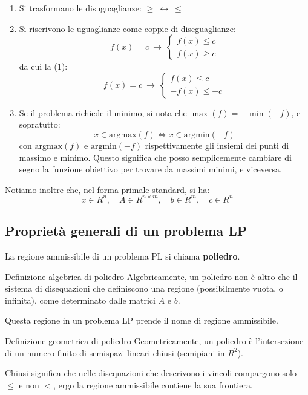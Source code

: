 \documentclass[a4paper,11pt]{article}
\begin{document}
\begin{enumerate}
	\item Si trasformano le disuguaglianze: $ \geq \ \leftrightarrow \ \leq $
	\item Si riscrivono le uguaglianze come coppie di diseguaglianze:
		$$
			f(x) = c \ \rightarrow \
		\begin{cases}
			f(x) \leq c \\ 
			f(x) \geq c
		\end{cases}
		$$
		da cui la (1):
		$$
			f(x) = c \ \rightarrow \
		\begin{cases}
			f(x) \leq c \\ 
			-f(x) \leq -c
		\end{cases}
		$$
	\item Se il problema richiede il minimo, si nota che $ \max(f) = -\min(-f) $, e sopratutto:
		$$
		\bar{x} \in \mathrm{argmax}(f) \Leftrightarrow \bar{x} \in \mathrm{argmin}(-f)
		$$
		con $ \mathrm{argmax}(f) $ e $ \mathrm{argmin}(-f) $ rispettivamente gli insiemi dei punti di massimo e minimo.
		Questo significa che posso semplicemente cambiare di segno la funzione obiettivo per trovare da massimi minimi, e viceversa.
\end{enumerate}

Notiamo inoltre che, nel forma primale standard, si ha:
$$
	x \in R^n, \quad
	A \in R^{n \times m}, \quad
	b \in R^m, \quad
	c \in R^n
$$

\subsection{Proprietà generali di un problema LP}
La regione ammissibile di un problema PL si chiama \textbf{poliedro}.

\begin{definition}{Definizione algebrica di poliedro}
	Algebricamente, un poliedro non è altro che il sistema di disequazioni che definiscono una regione (possibilmente vuota, o infinita), come determinato dalle matrici $A$ e $b$. 
\end{definition}

Questa regione in un problema LP prende il nome di regione ammissibile.

\begin{definition}{Definizione geometrica di poliedro}
	Geometricamente, un poliedro è l'intersezione di un numero finito di semispazi lineari chiusi (semipiani in $R^2$).
\end{definition}

Chiusi significa che nelle disequazioni che descrivono i vincoli compargono solo $\leq$ e non $<$, ergo la regione ammissibile contiene la sua frontiera.
\end{document}

